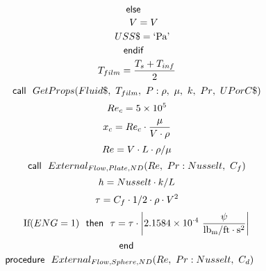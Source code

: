 \documentclass[10pt,fleqn]{article}
\newcommand{\F}[1]{\mbox{$#1$}}
\newcommand{\K}[1]{\mbox{\sf#1\ \ \mit}}
\newcommand{\KS}[1]{\mbox{\sf\ \ #1\ \ \mit}}
\newcommand{\SC}[1]{\mbox{`#1'}\  }
\newcommand{\V}[1]{\mbox{$ #1 $}}
\newcommand{\I}{\mbox{\hspace{0.20in}}}
\begin{document}
\begin{equation}
\I \label{EES Eqn:77}
\K{else} 
\end{equation}
\begin{equation}
\I \I \label{EES Eqn:78}
V=V 
\end{equation}
\begin{equation}
\I \I \label{EES Eqn:79}
USS\$=\SC{Pa} 
\end{equation}
\begin{equation}
\I \label{EES Eqn:80}
\K{endif} 
\end{equation}
\begin{equation}
\I \label{EES Eqn:81}
T_{film}=\frac {T_{s}+T_{inf}}{ 2 } 
\end{equation}
\begin{equation}
\I \label{EES Eqn:82}
\K{call} \F{GetProps}{ \left( Fluid\$,\ T_{film},\ P: \rho,\  \mu,\ k,\ \V{Pr} ,\ UPorC\$ \right) } 
\end{equation}
\begin{equation}
\I \label{EES Eqn:83}
\V{Re} _{c}=5\times 10^{5} 
\end{equation}
\begin{equation}
\I \label{EES Eqn:84}
x_{c}=\V{Re} _{c}\cdot \frac {\mu}{ V\cdot \rho } 
\end{equation}
\begin{equation}
\I \label{EES Eqn:85}
\V{Re} =V\cdot L\cdot \rho/\mu 
\end{equation}
\begin{equation}
\I \label{EES Eqn:86}
\K{call} \F{External_{Flow,Plate,ND}}{ \left( \V{Re} ,\ \V{Pr} : \V{Nusselt} ,\ C_{f} \right) } 
\end{equation}
\begin{equation}
\I \label{EES Eqn:87}
h=\V{Nusselt} \cdot k/L 
\end{equation}
\begin{equation}
\I \label{EES Eqn:88}
\tau=C_{f}\cdot 1/2\cdot \rho\cdot V^{2} 
\end{equation}
\begin{equation}
\I \label{EES Eqn:89}
\mbox{If}{ \left( \V{ENG} =1 \right) } \KS{then} \tau=\tau\cdot \rm { \left|2.1584\times 10^{ \cdot 4}\ \frac {\rm{\psi}}{\rm{lb_{m}/ft \cdot s^{2}}}\right|} 
\end{equation}
\begin{equation}
\label{EES Eqn:90}
\K{end} 
\end{equation}
\vspace{0.1 in}
\begin{equation}
\label{EES Eqn:91}
\K{procedure} \F{External_{Flow,Sphere,ND}}{ \left( \V{Re} ,\ \V{Pr} :\V{Nusselt} ,\ C_{d} \right) } 
\end{equation}
\end{document}
